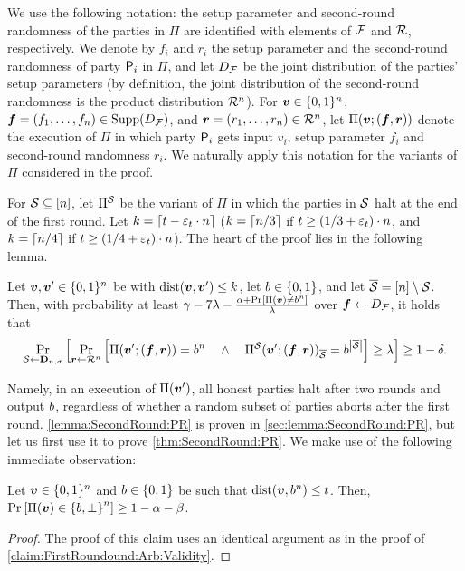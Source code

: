 We use the following notation: the setup parameter and second-round randomness of the parties in $\Pi$ are identified with elements of $\mathcal{F}$ and $\mathcal{R}$, respectively. We denote by $f_i$ and $r_i$ the setup parameter and the second-round
randomness of party $\mathsf{P}_i$ in $\Pi$, and let $D_{\cal F}$ be the joint distribution of the parties' setup parameters (by definition, the joint distribution of the second-round randomness is the product distribution $\mathcal{R}^n$). For ${ \boldsymbol{v}} \in {\{0,1\}^n}$, ${ \boldsymbol{f}}=(f_1,\ldots,f_n) \in \operatorname{Supp}(D_{\cal F})$, and ${ \boldsymbol{r}}=(r_1,\ldots,r_n) \in\mathcal{R}^n$, let $\Pi({ \boldsymbol{v}};({ \boldsymbol{f}},{ \boldsymbol{r}}))$ denote the execution of $\Pi$ in which party $\mathsf{P}_i$ gets input $v_i$, setup parameter $f_i$ and second-round randomness $r_i$. We naturally apply this notation for the variants of $\Pi$ considered in the proof.



For ${\cal{S}}\subseteq[n]$, let $\Pi^{\cal{S}}$ be the variant of $\Pi$ in which the parties in ${\cal{S}}$ halt at the end of the first round. Let $k = \left\lceil {t-\varepsilon_t\cdot n} \right\rceil$ (\ie $k = \left\lceil n/3 \right\rceil$ if $t\ge (1/3 + \varepsilon_t)\cdot n$, and $k = \left\lceil n/4 \right\rceil$ if $t\ge (1/4 + \varepsilon_t)\cdot n$). The heart of the proof lies in the following lemma.

\begin{lemma}\label{lemma:SecondRound:PR}
Let ${ \boldsymbol{v}},{ \boldsymbol{v}}' \in {\{0,1\}^n}$ be with $\mathrm{dist}({ \boldsymbol{v}},{ \boldsymbol{v}}') \le k$, let $b\in \{0,1\}$, and let ${\overline{\mathcal{S}}} = [n] \setminus {\cal{S}}$.  Then, with probability at least $\gamma- 7\lambda- \frac{\alpha + \Pr_{}\left[\Pi({ \boldsymbol{v}}) \ne b^n\right]}{\lambda}$ over ${ \boldsymbol{f}} \gets D_{\cal F}$, it holds that
\begin{align*}
\Pr_{{\cal{S}} \gets \mathbf{D}_{n,\sigma}}\left[\Pr_{{ \boldsymbol{r}} \gets \mathcal{R}^n}\left[\Pi({ \boldsymbol{v}}';({ \boldsymbol{f}},{ \boldsymbol{r}})) = b^n \quad \land \quad \Pi^{\cal{S}}({ \boldsymbol{v}}';({ \boldsymbol{f}},{ \boldsymbol{r}}))_{\overline{\mathcal{S}}} = b^{\left|{\overline{\mathcal{S}}}\right|} \right] \ge \lambda\right]\ge 1-\delta.
\end{align*}
\end{lemma}
Namely, in an execution of $\Pi({ \boldsymbol{v}}')$, all honest parties halt after two rounds and output $b$, regardless of whether a random subset of parties aborts after the first round. \cref{lemma:SecondRound:PR} is proven in \cref{sec:lemma:SecondRound:PR}, but let us first use it to prove \cref{thm:SecondRound:PR}. We make use of the following immediate observation:
\begin{claim}\label{claim:SecondRound:PR:Validity}
Let ${ \boldsymbol{v}} \in {\{0,1\}^n}$ and $b \in \{0,1\}$ be such that $\mathrm{dist}({ \boldsymbol{v}},b^n) \le t$. Then, $\Pr_{}\left[\Pi({ \boldsymbol{v}}) \in \left\{b,\perp\right\}^n \right] \ge 1 - \alpha - \beta $.
\end{claim}
\begin{proof}
The proof of this claim uses an identical argument as in the proof of \cref{claim:FirstRoundound:Arb:Validity}.	
\end{proof}


